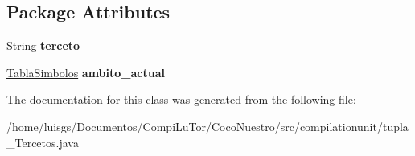 \subsection*{Package Attributes}
\begin{DoxyCompactItemize}
\item 
\hypertarget{classcompilationunit_1_1tupla___tercetos_ae99f70b8b071c861f34e05b76aebe4c8}{
String {\bfseries terceto}}
\label{classcompilationunit_1_1tupla___tercetos_ae99f70b8b071c861f34e05b76aebe4c8}

\item 
\hypertarget{classcompilationunit_1_1tupla___tercetos_a6b777961ad8adbbee973aaef921af715}{
\hyperlink{classcompilationunit_1_1_tabla_simbolos}{TablaSimbolos} {\bfseries ambito\_\-actual}}
\label{classcompilationunit_1_1tupla___tercetos_a6b777961ad8adbbee973aaef921af715}

\end{DoxyCompactItemize}


The documentation for this class was generated from the following file:\begin{DoxyCompactItemize}
\item 
/home/luisgs/Documentos/CompiLuTor/CocoNuestro/src/compilationunit/tupla\_\-Tercetos.java\end{DoxyCompactItemize}
